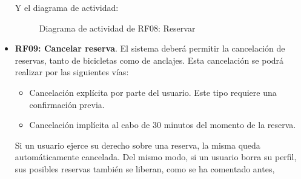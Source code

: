 \begin{itemize}
	Y el diagrama de actividad:
	\begin{figure}[!htb]
		\centering
		\caption{Diagrama de actividad de RF08: Reservar}
		\label{fig:diagramaActividad_RF08}
	\end{figure}
	
	\FloatBarrier
	\item \textbf{RF09: Cancelar reserva}. El sistema deberá permitir la cancelación de reservas, tanto de bicicletas como de anclajes. Esta cancelación se podrá realizar por las siguientes vías:
	\begin{itemize}
		\item Cancelación explícita por parte del usuario. Este tipo requiere una confirmación previa.
		\item Cancelación implícita al cabo de 30 minutos del momento de la reserva.
	\end{itemize}
	Si un usuario ejerce su derecho sobre una reserva, la misma queda automáticamente cancelada. Del mismo modo, si un usuario borra su perfil, sus posibles reservas también se liberan, como se ha comentado antes,
	

\end{itemize}
